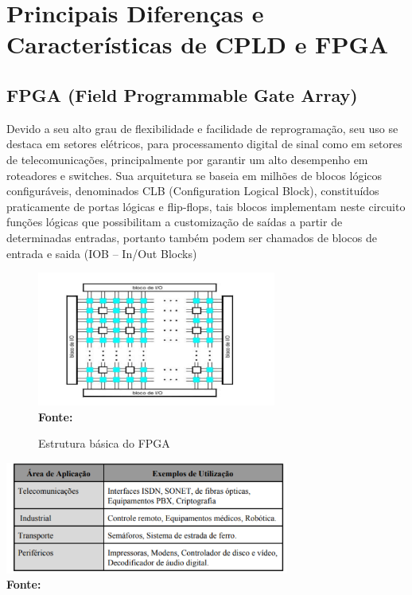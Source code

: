 \section{\esp Principais Diferenças e Características de CPLD e FPGA}

\subsection{ \esp FPGA (Field Programmable Gate Array)}

Devido a seu alto grau de flexibilidade e facilidade de reprogramação, seu uso se destaca em setores elétricos, para processamento digital de sinal como em setores de telecomunicações, principalmente por garantir um alto desempenho em roteadores e switches. Sua arquitetura se baseia em milhões de blocos lógicos configuráveis, denominados CLB (Configuration Logical Block), constituídos praticamente de portas lógicas e flip-flops, tais blocos implementam neste circuito funções lógicas que possibilitam a customização de saídas a partir de determinadas entradas, portanto também podem ser chamados de blocos de entrada e saida (IOB – In/Out Blocks)
\cite{Weber2016}

\begin{figure}[H]
	\centering	
	\caption{Estrutura básica do FPGA}
	\vspace{-0.4cm}
	\includegraphics[width=0.7\textwidth]{figuras/Figura4.png}
	 \vspace{-0.2cm}
	\\\textbf{\footnotesize Fonte:  }
	\label{fig:figura4}
\end{figure}
\vspace{-0.5cm}

\begin{quadro}[H]
	\centering	
	\caption{Possíveis aplicações em FPGAs}
	\vspace{-0.4cm}
	\includegraphics[width=0.7\textwidth]{figuras/Tabela2.png}
	 \vspace{-0.2cm}
	\\\textbf{\footnotesize Fonte:  }
	\label{table: Tabela1}
\end{quadro}
\vspace{0.5cm}

